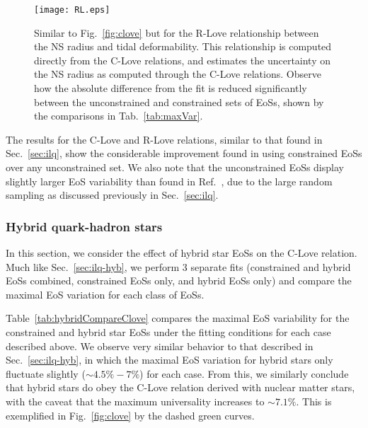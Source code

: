 \documentclass[prd,twocolumn,nofootinbib,superscriptaddress,amsmath,amssymb]{revtex4-1}
\begin{document}
\begin{figure}
\begin{center} 
\texttt{[image: RL.eps]}
\end{center}
\caption{
Similar to Fig.~\ref{fig:clove} but for the R-Love relationship between the NS radius and tidal deformability.
This relationship is computed directly from the C-Love relations, and estimates the uncertainty on the NS radius as computed through the C-Love relations.
Observe how the absolute difference from the fit is reduced significantly between the unconstrained and constrained sets of EoSs, shown by the comparisons in Tab.~\ref{tab:maxVar}.
}
\label{fig:rlove}
\end{figure} 

The results for the C-Love and R-Love relations, similar to that found in Sec.~\ref{sec:ilq}, show the considerable improvement found in using constrained EoSs over any unconstrained set.
We also note that the unconstrained EoSs display slightly larger EoS variability than found in Ref.~\cite{Yagi:binLove}, due to the large random sampling as discussed previously in Sec.~\ref{sec:ilq}.


\subsubsection{Hybrid quark-hadron stars}\label{sec:clove-hyb}
In this section, we consider the effect of hybrid star EoSs on the C-Love relation.
Much like Sec.~\ref{sec:ilq-hyb}, we perform 3 separate fits (constrained and hybrid EoSs combined, constrained EoSs only, and hybrid EoSs only) and compare the maximal EoS variation for each class of EoSs.

Table~\ref{tab:hybridCompareClove} compares the maximal EoS variability for the constrained and hybrid star EoSs under the fitting conditions for each case described above. 
We observe very similar behavior to that described in Sec.~\ref{sec:ilq-hyb}, in which the maximal EoS variation for hybrid stars only fluctuate slightly ($\sim 4.5\% - 7\%$) for each case.
From this, we similarly conclude that hybrid stars do obey the C-Love relation derived with nuclear matter stars, with the caveat that the maximum universality increases to $\sim 7.1\%$.
This is exemplified in Fig.~\ref{fig:clove} by the dashed green curves.
\end{document}

